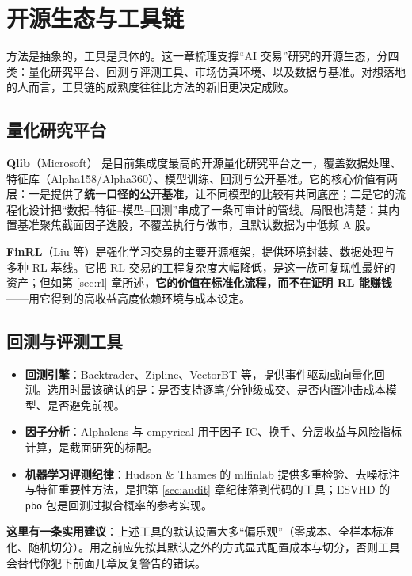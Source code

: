 \section{开源生态与工具链}\label{sec:ecosystem}

方法是抽象的，工具是具体的。这一章梳理支撑“AI 交易”研究的开源生态，分四类：量化研究平台、回测与评测工具、市场仿真环境、以及数据与基准。对想落地的人而言，工具链的成熟度往往比方法的新旧更决定成败。

\subsection{量化研究平台}

\textbf{Qlib}（Microsoft）\cite{qlib} 是目前集成度最高的开源量化研究平台之一，覆盖数据处理、特征库（Alpha158/Alpha360）、模型训练、回测与公开基准。它的核心价值有两层：一是提供了\textbf{统一口径的公开基准}，让不同模型的比较有共同底座；二是它的流程化设计把“数据--特征--模型--回测”串成了一条可审计的管线。局限也清楚：其内置基准聚焦截面因子选股，不覆盖执行与做市，且默认数据为中低频 A 股。

\textbf{FinRL}（Liu 等\cite{liu2021finrl}）是强化学习交易的主要开源框架，提供环境封装、数据处理与多种 RL 基线。它把 RL 交易的工程复杂度大幅降低，是这一族可复现性最好的资产；但如第 \ref{sec:rl} 章所述，\textbf{它的价值在标准化流程，而不在证明 RL 能赚钱}——用它得到的高收益高度依赖环境与成本设定。

\subsection{回测与评测工具}

\begin{itemize}
  \item \textbf{回测引擎}：Backtrader、Zipline、VectorBT 等，提供事件驱动或向量化回测。选用时最该确认的是：是否支持逐笔/分钟级成交、是否内置冲击成本模型、是否避免前视。
  \item \textbf{因子分析}：Alphalens 与 empyrical 用于因子 IC、换手、分层收益与风险指标计算，是截面研究的标配。
  \item \textbf{机器学习评测纪律}：Hudson \& Thames 的 mlfinlab 提供多重检验、去噪标注与特征重要性方法，是把第 \ref{sec:audit} 章纪律落到代码的工具；ESVHD 的 \texttt{pbo} 包是回测过拟合概率的参考实现。
\end{itemize}

\textbf{这里有一条实用建议}：上述工具的默认设置大多“偏乐观”（零成本、全样本标准化、随机切分）。用之前应先按其默认之外的方式显式配置成本与切分，否则工具会替代你犯下前面几章反复警告的错误。

